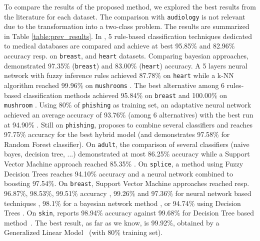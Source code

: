 \documentclass[sigconf,edbt]{acmart-edbt-workshops}
\begin{document}
To compare the results of the proposed method, we explored the best results from the literature for each dataset. The comparison with \texttt{audiology} is not relevant due to the transformation into a two-class problem. The results are summarized in Table \ref{table:prev_results}. In \cite{doi:10.1504/IJBISE.2016.081590}, 5 rule-based classification techniques dedicated to medical databases are compared and achieve at best 95.85\% and 82.96\% accuracy resp. on \texttt{breast}, and \texttt{heart} datasets. Comparing bayesian approaches, \cite{Jiang:2012:LIW:2124637.2124641} demonstrated 97.35\% (\texttt{breast}) and 83.00\% (\texttt{heart}) accuracy. A 5 layers neural network with fuzzy inference rules achieved 87.78\% on \texttt{heart} \cite{sagir2017hybridised} while a k-NN algorithm reached 99.96\% on \texttt{mushrooms} \cite{Das:2001:FWB:645530.658297}. The best alternative among 6 rules-based classification methods achieved 95.84\% on \texttt{breast} and 100.00\% on \texttt{mushroom} \cite{HADI2017287}. Using 80\% of \texttt{phishing} as training set, an adaptative neural network achieved an average accuracy of 93.76\% (among 6 alternatives) with the best run at 94.90\% \cite{7727750}. Still on \texttt{phishing}, \cite{7881507} proposes to combine several classifiers and reaches 97.75\% accuracy for the best hybrid model (and demonstrates 97.58\% for Random Forest classifier). On \texttt{adult}, the comparison of several classifiers (naive bayes, decision tree, ...) demonstrated at most 86.25\% accuracy \cite{kou2012evaluation} while a Support Vector Machine approach reached 85.35\% \cite{Lee2001}. On \texttt{splice}, a method using Fuzzy Decision Trees \cite{5409447} reaches 94.10\% accuracy and a neural network combined to boosting \cite{catak2017} 97.54\%. On \texttt{breast}, Support Vector Machine approaches reached resp. 96.87\%, 98.53\%, 99.51\% accuracy \cite{CHEN20119014, POLAT2007694, akay2009support}, 99.26\% and 97.36\% for neural network based techniques \cite{MARCANOCEDENO20119573, ubeyli2007implementing}, 98.1\% for a bayesian network method \cite{fallahi2011expert}, or 94.74\% using Decision Trees \cite{quinlan1996improved}. On \texttt{skin}, \cite{catak2017} reports 98.94\% accuracy against 99.68\% for Decision Tree based method~\cite{6627823}. The best result, as far as we know, is 99.92\%, obtained by a Generalized Linear Model~\cite{basterrech2015generalized} (with 80\% training set).
\end{document}
